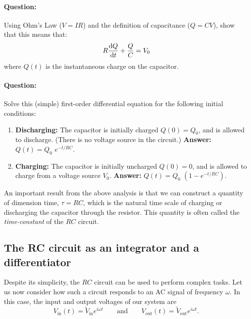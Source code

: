 \begin{question}
\paragraph{Question:} Using Ohm's Law ($V=IR$) and the definition of capacitance ($Q=CV$), show that this means that:
\begin{equation*}
    R \dv{Q}{t} + \frac{Q}{C} = V_0
\end{equation*}
where $Q(t)$ is the instantaneous charge on the capacitor.

\paragraph{Question:} Solve this (simple) first-order differential equation for the following initial conditions:
\begin{enumerate}
    \item \textbf{Discharging:} The capacitor is initially charged $Q(0) = Q_0$, and is allowed to discharge. (There is no voltage source in the circuit.) \hfill\textbf{Answer:} $Q(t) = Q_0\,\, e^{-t/RC}.$
    
    \item \textbf{Charging:} The capacitor is initially uncharged $Q(0) = 0$, and is allowed to charge from a voltage source $V_0$.
    \hfill\textbf{Answer:} $Q(t) = Q_0\,\, \left(1 - e^{-t/RC}\right).$
\end{enumerate}
\end{question}


An important result from the above analysis is that we can construct a quantity of dimension time, $\tau = RC$, which is the natural time scale of charging or discharging the capacitor through the resistor. This quantity is often called the \textsl{time-constant} of the $RC$ circuit.

\subsection*{The RC circuit as an integrator and a differentiator}

Despite its simplicity, the $RC$ circuit can be used to perform complex tasks. Let us now consider how such a circuit responds to an AC signal of frequency $\omega$. In this case, the input and output voltages of our system are 
\begin{equation}
        V_\text{in}(t) = \widetilde{V}_\text{in} e^{i\omega t} \quad \quad \text{and} \quad \quad V_\text{out}(t) = \widetilde{V}_\text{out} e^{i\omega t}.
\end{equation}

